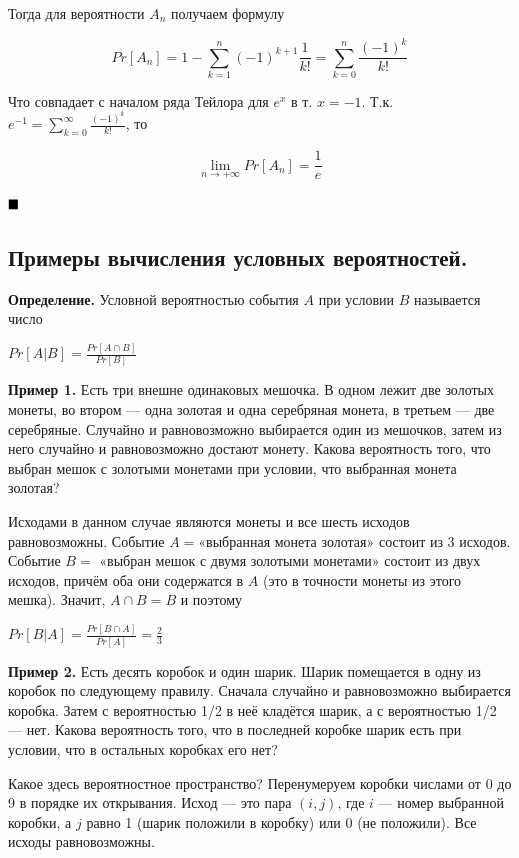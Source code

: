 \documentclass[a4paper, 10pt]{article}
\begin{document}
Тогда для вероятности $A_n$ получаем формулу

$$Pr[A_n] = 1 - \sum_{k = 1}^n (-1)^{k + 1} \frac{1}{k!} = \sum_{k = 0}^n \frac{(-1)^k}{k!}$$

Что совпадает с началом ряда Тейлора для $e^x$ в т. $x = -1$. Т.к. $e^{-1} = \sum_{k=0}^\infty \frac{(-1)^k}{k!}$, то

$$\lim \limits_{n \to +\infty} Pr[A_n] = \frac{1}{e}$$

$\hfill \blacksquare$

\subsection{Примеры вычисления условных вероятностей.}

\textbf{Определение.} Условной вероятностью события $A$ при условии $B$ называется число

\begin{center}
    $\displaystyle Pr[A | B] = \frac{Pr[A \cap B]}{Pr[B]}$
\end{center}

\textbf{Пример 1.} Есть три внешне одинаковых мешочка. В одном лежит две золотых монеты, во втором — одна золотая и одна серебряная монета, в третьем — две серебряные. Случайно и равновозможно выбирается один из мешочков, затем из него случайно и равновозможно достают монету. Какова вероятность того, что выбран мешок с золотыми монетами при условии, что выбранная монета золотая?

Исходами в данном случае являются монеты и все шесть исходов равновозможны. Событие $A =$«выбранная монета золотая» состоит из 3 исходов. Событие $B =$ «выбран мешок с двумя золотыми монетами» состоит из двух исходов, причём оба они содержатся в $A$ (это в точности монеты из этого мешка). Значит, $A \cap B = B$ и поэтому

\begin{center}
    $\displaystyle Pr[B | A] = \frac{Pr[B \cap A]}{Pr[A]} = \frac{2}{3}$
\end{center}

\textbf{Пример 2.} Есть десять коробок и один шарик. Шарик помещается в одну из коробок по следующему правилу. Сначала случайно и равновозможно выбирается коробка. Затем с вероятностью 1/2 в неё кладётся шарик, а с вероятностью 1/2 — нет. Какова вероятность того, что в последней коробке шарик есть при условии, что в остальных коробках его нет?

Какое здесь вероятностное пространство? Перенумеруем коробки числами от 0 до 9 в порядке их открывания. Исход — это пара $(i, j)$, где $i$ — номер выбранной коробки, а $j$ равно 1 (шарик положили в коробку) или 0 (не положили). Все исходы равновозможны.
\end{document}

